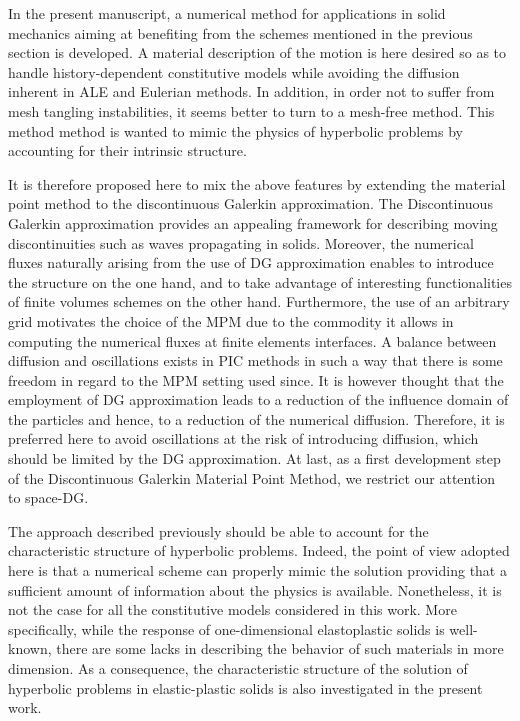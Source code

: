 In the present manuscript, a numerical method for applications in solid mechanics aiming at benefiting from the schemes mentioned in the previous section is developed.
A material description of the motion is here desired so as to handle history-dependent constitutive models while avoiding the diffusion inherent in ALE and Eulerian methods.
In addition, in order not to suffer from mesh tangling instabilities, it seems better to turn to a mesh-free method.
This method method is wanted to mimic the physics of hyperbolic problems by accounting for their intrinsic structure.

It is therefore proposed here to mix the above features by extending the material point method to the discontinuous Galerkin approximation.
The Discontinuous Galerkin approximation provides an appealing framework for describing moving discontinuities such as waves propagating in solids.
Moreover, the numerical fluxes naturally arising from the use of DG approximation enables to introduce the structure on the one hand, and to take advantage of interesting functionalities of finite volumes schemes on the other hand.
Furthermore, the use of an arbitrary grid motivates the choice of the MPM due to the commodity it allows in computing the numerical fluxes at finite elements interfaces.
A balance between diffusion and oscillations exists in PIC methods in such a way that there is some freedom in regard to the MPM setting used since.
It is however thought that the employment of DG approximation leads to a reduction of the influence domain of the particles and hence, to a reduction of the numerical diffusion. 
Therefore, it is preferred here to avoid oscillations at the risk of introducing diffusion, which should be limited by the DG approximation.
At last, as a first development step of the Discontinuous Galerkin Material Point Method, we restrict our attention to space-DG.

The approach described previously should be able to account for the characteristic structure of hyperbolic problems.
Indeed, the point of view adopted here is that a numerical scheme can properly mimic the solution providing that a sufficient amount of information about the physics is available.
Nonetheless, it is not the case for all the constitutive models considered in this work.
More specifically, while the response of one-dimensional elastoplastic solids is well-known, there are some lacks in describing the behavior of such materials in more dimension. 
As a consequence, the characteristic structure of the solution of hyperbolic problems in elastic-plastic solids is also investigated in the present work.








